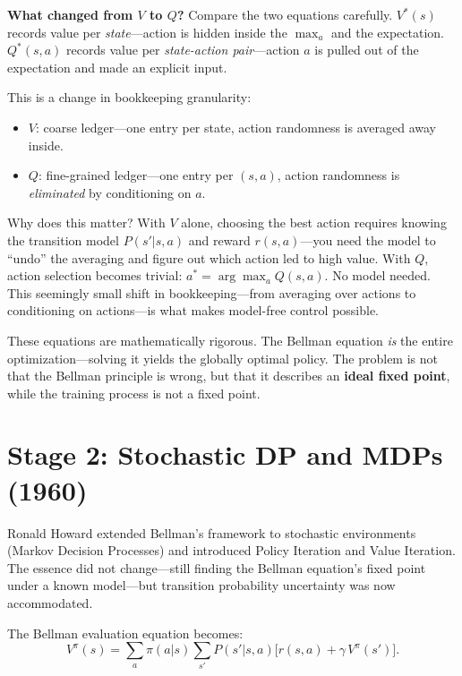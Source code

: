 \noindent\textbf{What changed from $V$ to $Q$?}
Compare the two equations carefully.
$V^{\ast}(s)$ records value per \emph{state}---action is hidden inside the $\max_a$ and the expectation.
$Q^{\ast}(s,a)$ records value per \emph{state-action pair}---action $a$ is pulled out of the expectation and made an explicit input.

This is a change in bookkeeping granularity:
\begin{itemize}[nosep]
    \item $V$: coarse ledger---one entry per state, action randomness is averaged away inside.
    \item $Q$: fine-grained ledger---one entry per $(s,a)$, action randomness is \emph{eliminated} by conditioning on $a$.
\end{itemize}

Why does this matter?
With $V$ alone, choosing the best action requires knowing the transition model $P(s'|s,a)$ and reward $r(s,a)$---you need the model to ``undo'' the averaging and figure out which action led to high value.
With $Q$, action selection becomes trivial: $a^{\ast} = \arg\max_a Q(s,a)$.
No model needed.
This seemingly small shift in bookkeeping---from averaging over actions to conditioning on actions---is what makes model-free control possible.

These equations are mathematically rigorous.
The Bellman equation \emph{is} the entire optimization---solving it yields the globally optimal policy.
The problem is not that the Bellman principle is wrong, but that it describes an \textbf{ideal fixed point}, while the training process is not a fixed point.

\section{Stage 2: Stochastic DP and MDPs (1960)}
\label{sec:stage2-mdp}

Ronald Howard extended Bellman's framework to stochastic environments (Markov Decision Processes) and introduced Policy Iteration and Value Iteration.
The essence did not change---still finding the Bellman equation's fixed point under a known model---but transition probability uncertainty was now accommodated.

The Bellman evaluation equation becomes:
\begin{equation}
V^{\pi}(s) = \sum_a \pi(a|s) \sum_{s'} P(s'|s,a)\bigl[r(s,a) + \gamma\, V^{\pi}(s')\bigr].
\end{equation}

